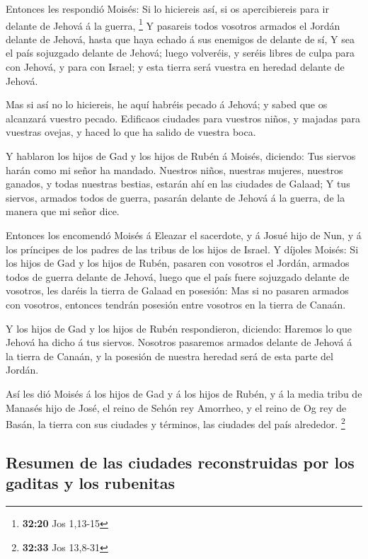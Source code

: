  Entonces les respondió Moisés: Si lo hiciereis así, si
os apercibiereis para ir delante de Jehová á la guerra, \footnote{\textbf{32:20}
  Jos 1,13-15}  Y pasareis todos vosotros armados el
Jordán delante de Jehová, hasta que haya echado á sus enemigos de
delante de sí,  Y sea el país sojuzgado delante de
Jehová; luego volveréis, y seréis libres de culpa para con Jehová, y
para con Israel; y esta tierra será vuestra en heredad delante de
Jehová.

 Mas si así no lo hiciereis, he aquí habréis pecado á
Jehová; y sabed que os alcanzará vuestro pecado. 
Edificaos ciudades para vuestros niños, y majadas para vuestras ovejas,
y haced lo que ha salido de vuestra boca.

 Y hablaron los hijos de Gad y los hijos de Rubén á
Moisés, diciendo: Tus siervos harán como mi señor ha mandado.
 Nuestros niños, nuestras mujeres, nuestros ganados, y
todas nuestras bestias, estarán ahí en las ciudades de Galaad;
 Y tus siervos, armados todos de guerra, pasarán delante
de Jehová á la guerra, de la manera que mi señor dice.

 Entonces los encomendó Moisés á Eleazar el sacerdote, y
á Josué hijo de Nun, y á los príncipes de los padres de las tribus de
los hijos de Israel.  Y díjoles Moisés: Si los hijos de
Gad y los hijos de Rubén, pasaren con vosotros el Jordán, armados todos
de guerra delante de Jehová, luego que el país fuere sojuzgado delante
de vosotros, les daréis la tierra de Galaad en posesión: 
Mas si no pasaren armados con vosotros, entonces tendrán posesión entre
vosotros en la tierra de Canaán.

 Y los hijos de Gad y los hijos de Rubén respondieron,
diciendo: Haremos lo que Jehová ha dicho á tus siervos. 
Nosotros pasaremos armados delante de Jehová á la tierra de Canaán, y la
posesión de nuestra heredad será de esta parte del Jordán.

 Así les dió Moisés á los hijos de Gad y á los hijos de
Rubén, y á la media tribu de Manasés hijo de José, el reino de Sehón rey
Amorrheo, y el reino de Og rey de Basán, la tierra con sus ciudades y
términos, las ciudades del país alrededor. \footnote{\textbf{32:33} Jos
  13,8-31}

\hypertarget{resumen-de-las-ciudades-reconstruidas-por-los-gaditas-y-los-rubenitas}{%
\subsection{Resumen de las ciudades reconstruidas por los gaditas y los
rubenitas}\label{resumen-de-las-ciudades-reconstruidas-por-los-gaditas-y-los-rubenitas}}


